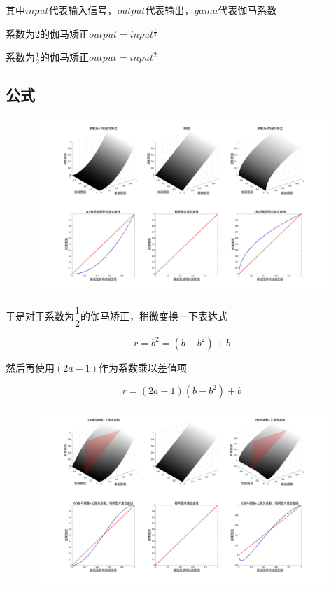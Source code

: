 其中$input$代表输入信号，$output$代表输出，$gama$代表伽马系数

系数为$2$的伽马矫正$output= input^{\frac{1}{2}}$	

系数为$\frac{1}{2}$的伽马矫正$output= input^{2}$

\subsection{ 公式}

\begin{figure}[h!]
	\centering
	\includegraphics[width=\linewidth]{figure/伽马1}
	\caption{}
	\label{fig:1}
\end{figure}

于是对于系数为$\dfrac{1}{2}$的伽马矫正，稍微变换一下表达式

\begin{equation}
	r =b^2= (b-b^2) +b
	\end{equation}

然后再使用$(2a-1)$作为系数乘以差值项

\begin{equation}
	r = (2a-1)(b-b^2) +b
	\end{equation}
\begin{figure}[h!]
	\centering
	\includegraphics[width=\linewidth]{figure/伽马2}
	\caption{}
	\label{fig:2}
\end{figure}

